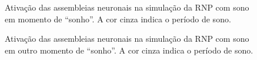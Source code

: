 \begin{figure}[!ht]
\caption{Ativação das assembleias neuronais na simulação da RNP com sono em momento de ``sonho''. A cor cinza indica o período de sono.}
\end{figure}

\begin{figure}[!ht]
\caption{Ativação das assembleias neuronais na simulação da RNP com sono em outro momento de ``sonho''. A cor cinza indica o período de sono.}
\end{figure}